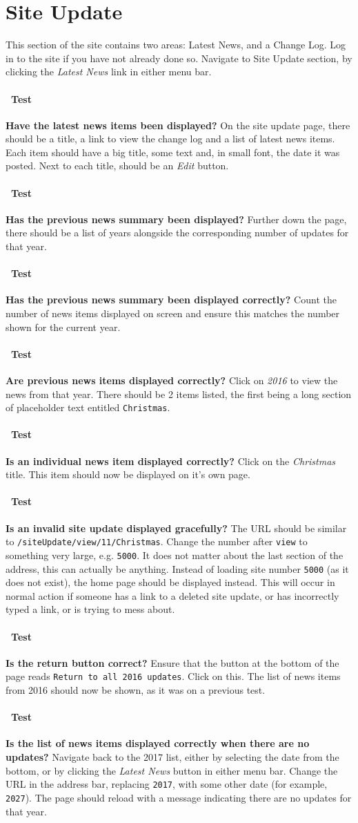 \documentclass[12pt]{article}
\newcounter{Test}
\newcommand{\test}[1]{%
\stepcounter{Test}%
\paragraph{\Circle\ Test \theTest} \textbf{#1} }
\begin{document}
\section{Site Update}\label{sec:siteUpdate}
This section of the site contains two areas: Latest News, and a Change Log. Log in to the site if you have not already done so. Navigate to Site Update section, by clicking the \textit{Latest News} link in either menu bar.

\test{Have the latest news items been displayed?}
On the site update page, there should be a title, a link to view the change log and a list of latest news items. Each item should have a big title, some text and, in small font, the date it was posted. Next to each title, should be an \textit{Edit} button.

\test{Has the previous news summary been displayed?}
Further down the page, there should be a list of years alongside the corresponding number of updates for that year.

\test{Has the previous news summary been displayed correctly?}
Count the number of news items displayed on screen and ensure this matches the number shown for the current year.

\test{Are previous news items displayed correctly?}
Click on \textit{2016} to view the news from that year. There should be 2 items listed, the first being a long section of placeholder text entitled \texttt{Christmas}.

\test{Is an individual news item displayed correctly?}
Click on the \textit{Christmas} title. This item should now be displayed on it's own page.

\test{Is an invalid site update displayed gracefully?}
The URL should be similar to \texttt{/siteUpdate/view/11/Christmas}. Change the number after \texttt{view} to something very large, e.g. \texttt{5000}. It does not matter about the last section of the address, this can actually be anything. Instead of loading site number \texttt{5000} (as it does not exist), the home page should be displayed instead. This will occur in normal action if someone has a link to a deleted site update, or has incorrectly typed a link, or is trying to mess about.

\test{Is the return button correct?}
Ensure that the button at the bottom of the page reads \texttt{Return to all 2016 updates}. Click on this. The list of news items from 2016 should now be shown, as it was on a previous test.

\test{Is the list of news items displayed correctly when there are no updates?}
Navigate back to the 2017 list, either by selecting the date from the bottom, or by clicking the \textit{Latest News} button in either menu bar. Change the URL in the address bar, replacing \texttt{2017}, with some other date (for example, \texttt{2027}). The page should reload with a message indicating there are no updates for that year.
\end{document}
